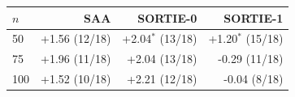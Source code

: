 \begin{tabular}{lrrr}\toprule
$n$ & SAA & SORTIE-0 & SORTIE-1 \\
\midrule
50 & +1.56 (12/18) & +2.04$^\ast$ (13/18) & +1.20$^\ast$ (15/18) \\
75 & +1.96 (11/18) & +2.04 (13/18) & -0.29 (11/18) \\
100 & +1.52 (10/18) & +2.21 (12/18) & -0.04 (8/18) \\
\bottomrule
\end{tabular}
